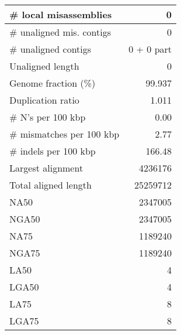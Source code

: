 \documentclass[12pt,a4paper]{article}
\begin{document}
\begin{table}[ht]
\begin{center}
\begin{tabular}{|l*{1}{|r}|}
\# local misassemblies & 0 \\ \hline
\# unaligned mis. contigs & 0 \\ \hline
\# unaligned contigs & 0 + 0 part \\ \hline
Unaligned length & 0 \\ \hline
Genome fraction (\%) & 99.937 \\ \hline
Duplication ratio & 1.011 \\ \hline
\# N's per 100 kbp & 0.00 \\ \hline
\# mismatches per 100 kbp & 2.77 \\ \hline
\# indels per 100 kbp & 166.48 \\ \hline
Largest alignment & 4236176 \\ \hline
Total aligned length & 25259712 \\ \hline
NA50 & 2347005 \\ \hline
NGA50 & 2347005 \\ \hline
NA75 & 1189240 \\ \hline
NGA75 & 1189240 \\ \hline
LA50 & 4 \\ \hline
LGA50 & 4 \\ \hline
LA75 & 8 \\ \hline
LGA75 & 8 \\ \hline
\end{tabular}
\end{center}
\end{table}
\end{document}
